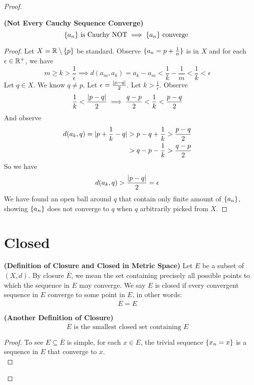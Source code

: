 \documentclass{report}
\begin{document}
\begin{proof}
\begin{theorem}
\label{3.1.12}
\textbf{(Not Every Cauchy Sequence Converge)} 
\begin{equation}
\{ a_n \}\text{ is Cauchy NOT}\implies \{ a_n \}\text{ converge }
\end{equation}
\end{theorem}
\begin{proof}
Let $X=\mathbb{R} \setminus \{ p \}$ be standard. Observe $\{ a_n=p+\frac{1}{n} \}$ is in $X$ and for each $\epsilon \in\mathbb{R}^+$, we have
\begin{equation}
m\geq k>\frac{1}{\epsilon } \implies d(a_m,a_k)= a_k-a_m<\frac{1}{k}-\frac{1}{m}<\frac{1}{k}<\epsilon 
\end{equation}
Let $q\in X$. We know $q\neq p$. Let $\epsilon =\frac{|p-q|}{2}$. Let $k>\frac{1}{\epsilon }$. Observe
\begin{equation}
\frac{1}{k}<\frac{|p-q|}{2}\implies \frac{q-p}{2}<\frac{1}{k}<\frac{p-q}{2}
\end{equation}
And observe
\begin{align}
  d(a_k,q)=|p+\frac{1}{k}-q|&>p-q+\frac{1}{k}>\frac{p-q}{2}\\
  &>q-p-\frac{1}{k}>\frac{q-p}{2}
\end{align}
So we have
\begin{equation}
d(a_k,q)>\frac{|p-q|}{2}=\epsilon 
\end{equation}
We have found an open ball around $q$ that contain only finite amount of  $\{ a_n \}$, showing $\{ a_n \}$ does not converge to $q$ when $q$ arbitrarily picked from  $X$.

\end{proof}
\section{Closed}
\begin{definition}
\label{3.2.1}
\textbf{(Definition of Closure and Closed in Metric Space)} Let $E$ be a subset of  $(X,d)$. By closure $\overline{E}$, we mean the set containing precisely all possible points to which the sequence in $E$ may converge. We say $E$ is closed if every convergent sequence in $E$ converge to some point in $E$, in other words:
 \begin{equation}
\overline{E}=E
\end{equation}
\end{definition}
\begin{theorem}
\label{3.2.2}
\textbf{(Another Definition of Closure)}
\begin{equation}
\overline{E}\text{ is the smallest closed set containing }E
\end{equation}
\end{theorem}
\begin{proof}
To see $E\subseteq \overline{E}$ is simple, for each $x\in E$, the trivial sequence $\{ x_n=x \}$ is a sequence in $E$ that converge to $x$.\\


\end{proof}
\end{proof}
\end{document}
